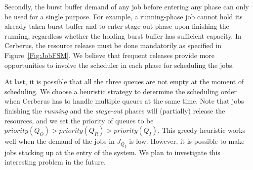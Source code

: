 Secondly,  the burst buffer demand of any job before entering any phase can only be used for a single purpose.
For example, a running-phase job cannot hold its already taken burst buffer
and to enter stage-out phase upon finishing the running, regardless whether the holding burst buffer has sufficient capacity.
In Cerberus, the resource release must be done mandatorily as specified in Figure~\ref{Fig:JobFSM}.
We believe that frequent releases provide more opportunities to involve the scheduler in each phase for scheduling the jobs.

At last, it is possible that all the three queues are not empty at the moment of scheduling.
We choose a heuristic strategy to determine the scheduling order when
Cerberus has to handle multiple queues at the same time.
Note that jobs finishing the \textit{running} and the \textit{stage-out} phases
will (partially) release the resources, and we set the priority of queues to be $priority(Q_O) > priority(Q_R) > priority(Q_I)$.
This greedy heuristic works well when the demand of the jobs in $J_{Q_I}$ is low.
However, it is possible to make jobs stacking up at the entry of the system.
We plan to investigate this interesting problem in the future.


